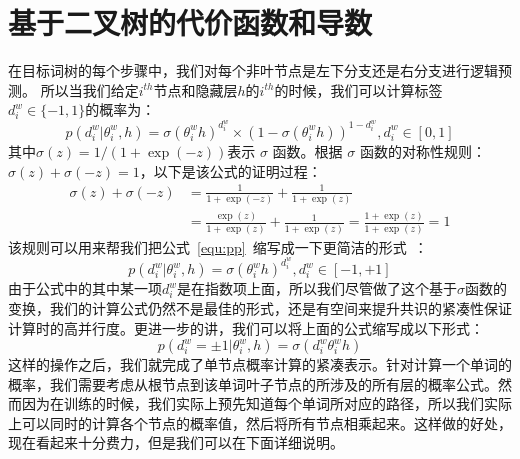 \section{基于二叉树的代价函数和导数}
在目标词树的每个步骤中，我们对每个非叶节点是左下分支还是右分支进行逻辑预测。 所以当我们给定$ i^{th} $节点和隐藏层$ h $的$ i^{th} $的时候，我们可以计算标签 $d^w_i\in \{-1,1\}$的概率为：
 \begin{equation}\label{equ:pp}
p(d^w_i|\theta_{i}^w,h) =\sigma(\theta_{i}^w h)^{d_i^w}\times(1-\sigma(\theta_{i}^w h))^{1-{d_i^w}},d_i^w \in [0,1]
\end{equation}
其中$ \sigma(z)= 1 /(1 + \exp(-z))$表示 $\sigma$ 函数。根据 $\sigma$ 函数的对称性规则：$\sigma(z)+ \sigma(-z)=1 $，以下是该公式的证明过程：
\begin{equation}\label{equ:sig}
\begin{split}
\sigma(z)+ \sigma(-z)  &=\frac{1}{1 + \exp(-z)}+\frac{1}{1 + \exp(z)}\\
  &=\frac{\exp(z)}{1 + \exp(z)}+\frac{1}{1 + \exp(z)}=\frac{1 + \exp(z)}{1 + \exp(z)}=1
\end{split}
\end{equation}
该规则可以用来帮我们把公式~\ref{equ:pp}~缩写成一下更简洁的形式~：
 \begin{equation}
p(d^w_i|\theta_{i}^w,h) =\sigma(\theta_{i}^w h)^{d_i^w}, d_i^w \in [-1,+1]
\end{equation}
由于公式中的其中某一项${d_i^w}$是在指数项上面，所以我们尽管做了这个基于$\sigma$函数的变换，我们的计算公式仍然不是最佳的形式，还是有空间来提升共识的紧凑性保证计算时的高并行度。更进一步的讲，我们可以将上面的公式缩写成以下形式：
\begin{equation}
p(d^w_i=\pm 1|\theta_{i}^w,h) = \sigma({d_i^w}\theta_{i}^w h)
\end{equation}
这样的操作之后，我们就完成了单节点概率计算的紧凑表示。针对计算一个单词的概率，我们需要考虑从根节点到该单词叶子节点的所涉及的所有层的概率公式。然而因为在训练的时候，我们实际上预先知道每个单词所对应的路径，所以我们实际上可以同时的计算各个节点的概率值，然后将所有节点相乘起来。这样做的好处，现在看起来十分费力，但是我们可以在下面详细说明。


